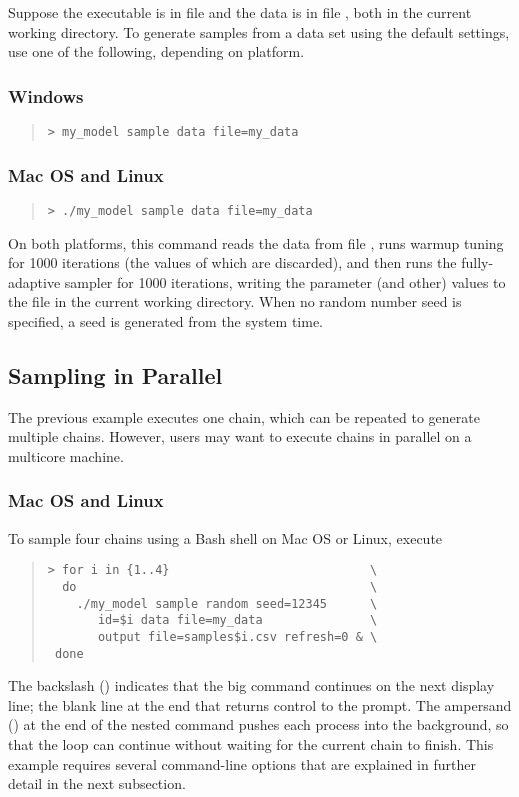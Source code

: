 Suppose the executable is in file  and the data is in
file , both in the current working directory.  To
generate samples from a data set using the default settings, use one
of the following, depending on platform.
%
\subsubsection{Windows}
%
\begin{quote}
\begin{Verbatim}[fontshape=sl]
> my_model sample data file=my_data
\end{Verbatim}
\end{quote}
%

\subsubsection{Mac OS and Linux}
%
\begin{quote}
\begin{Verbatim}[fontshape=sl]
> ./my_model sample data file=my_data
\end{Verbatim}
\end{quote}
%
On both platforms, this command reads the data from file
, runs warmup tuning for 1000 iterations (the values
of which are discarded), and then runs the fully-adaptive \NUTS
sampler for 1000 iterations, writing the parameter (and other) values
to the file  in the current working directory.  When
no random number seed is specified, a seed is generated from the
system time.

\subsection{Sampling in Parallel}

The previous example executes one chain, which can be repeated to 
generate multiple chains. However, users may want to execute chains
in parallel on a multicore machine. 

\subsubsection{Mac OS and Linux}

To sample four chains using a Bash shell on Mac OS or Linux, execute
%
\begin{quote}
\begin{Verbatim}[fontshape=sl]
> for i in {1..4}                            \
  do                                         \
    ./my_model sample random seed=12345      \ 
       id=$i data file=my_data               \
       output file=samples$i.csv refresh=0 & \
 done
\end{Verbatim}
\end{quote}
%
The backslash (\code{\textbackslash}) indicates that the big command
continues on the next display line; the blank line at the end that
returns control to the prompt. The ampersand (\code{\&}) at the end of
the nested command pushes each process into the background, so that
the loop can continue without waiting for the current chain to
finish. This example requires several command-line options that are
explained in further detail in the next subsection.

